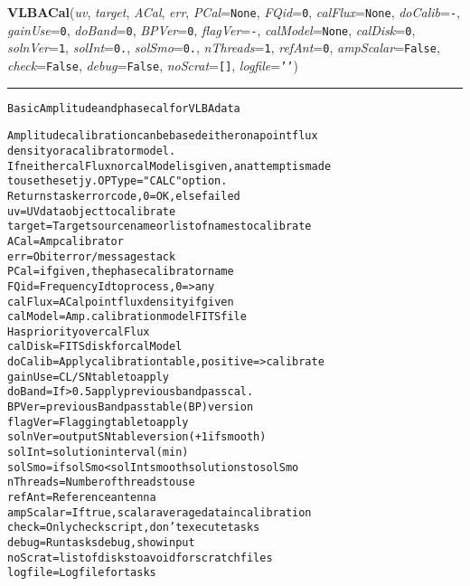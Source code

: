 \begin{boxedminipage}{\textwidth}
    \vspace{1ex}

    \end{boxedminipage}

    \label{VLBACal:VLBACal}
    \vspace{0.5ex}

    \begin{boxedminipage}{\textwidth}

    \raggedright \textbf{VLBACal}(\textit{uv}, \textit{target}, \textit{ACal}, \textit{err}, \textit{PCal}=\texttt{N\-o\-n\-e\-}, \textit{FQid}=\texttt{0\-}, \textit{calFlux}=\texttt{N\-o\-n\-e\-}, \textit{doCalib}=\texttt{-\-}, \textit{gainUse}=\texttt{0\-}, \textit{doBand}=\texttt{0\-}, \textit{BPVer}=\texttt{0\-}, \textit{flagVer}=\texttt{-\-}, \textit{calModel}=\texttt{N\-o\-n\-e\-}, \textit{calDisk}=\texttt{0\-}, \textit{solnVer}=\texttt{1\-}, \textit{solInt}=\texttt{0\-.\-}, \textit{solSmo}=\texttt{0\-.\-}, \textit{nThreads}=\texttt{1\-}, \textit{refAnt}=\texttt{0\-}, \textit{ampScalar}=\texttt{F\-a\-l\-s\-e\-}, \textit{check}=\texttt{F\-a\-l\-s\-e\-}, \textit{debug}=\texttt{F\-a\-l\-s\-e\-}, \textit{noScrat}=\texttt{[\-]\-}, \textit{logfile}=\texttt{'\-'\-})

    \vspace{-1.5ex}

    \rule{\textwidth}{0.5\fboxrule}
\begin{alltt}
Basic Amplitude and phase cal for VLBA data

Amplitude calibration can be based either on a point flux
density or a calibrator model.
If neither calFlux nor calModel is given, an attempt is made
to use the setjy.OPType="CALC" option.
Returns task error code, 0=OK, else failed
uv       = UV data object to calibrate
target   = Target source name or list of names to calibrate
ACal     = Amp calibrator
err      = Obit error/message stack
PCal     = if given, the phase calibrator name
FQid     = Frequency Id to process, 0={\textgreater}any
calFlux  = ACal point flux density if given
calModel = Amp. calibration model FITS file
           Has priority over calFlux
calDisk  = FITS disk for calModel
doCalib  = Apply calibration table, positive={\textgreater}calibrate
gainUse  = CL/SN table to apply
doBand   = If {\textgreater}0.5 apply previous bandpass cal.
BPVer    = previous Bandpass table (BP) version
flagVer  = Flagging table to apply
solnVer  = output SN table version (+1 if smooth)
solInt   = solution interval (min)
solSmo   = if solSmo{\textless}solInt smooth solutions to solSmo
nThreads = Number of threads to use
refAnt   = Reference antenna
ampScalar= If true, scalar average data in calibration
check    = Only check script, don't execute tasks
debug    = Run tasks debug, show input
noScrat  = list of disks to avoid for scratch files
logfile  = Log file for tasks\end{alltt}

    \vspace{1ex}

    \end{boxedminipage}

